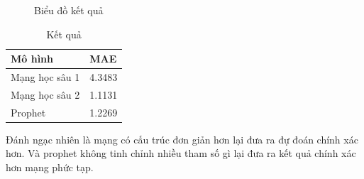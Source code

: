 \begin{figure}[!htb]
	\caption{\label{fig:predic-res} Biểu đồ kết quả}
\end{figure}


\begin{table}[h]
	\begin{tabularx}{\textwidth}{X | X }
		Mô hình	& MAE	  \\ \hline
		Mạng học sâu 1	& 4.3483 \\ \hline
		Mạng học sâu 2	& 1.1131 \\ \hline
		Prophet	& 1.2269 \\
	\end{tabularx}
	\label{tab:result}
	\caption{Kết quả}
\end{table}
Đánh ngạc nhiên là mạng có cấu trúc đơn giản hơn lại đưa ra đự đoán chính xác hơn. Và prophet không tinh chỉnh nhiều tham số gì lại đưa ra kết quả chính xác hơn mạng phức tạp.
